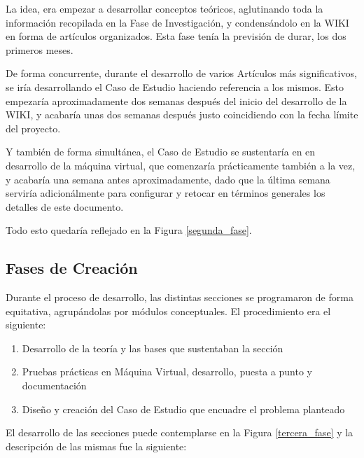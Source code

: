 La idea, era empezar a desarrollar conceptos teóricos, aglutinando toda la información recopilada en la Fase de Investigación, y condensándolo en la WIKI en forma de artículos organizados. Esta fase tenía la previsión de durar, los dos primeros meses.

De forma concurrente, durante el desarrollo de varios Artículos más significativos, se iría desarrollando el Caso de Estudio haciendo referencia a los mismos. Esto empezaría aproximadamente dos semanas después del inicio del desarrollo de la WIKI, y acabaría unas dos semanas después justo coincidiendo con la fecha límite del proyecto.

Y también de forma simultánea, el Caso de Estudio se sustentaría en en desarrollo de la máquina virtual, que comenzaría prácticamente también a la vez, y acabaría una semana antes aproximadamente, dado que la última semana serviría adicionálmente para configurar y retocar en términos generales los detalles de este documento.

Todo esto quedaría reflejado en la Figura \ref{segunda_fase}.


\subsection{Fases de Creación}

Durante el proceso de desarrollo, las distintas secciones se programaron de forma equitativa, agrupándolas por módulos conceptuales. El procedimiento era el siguiente:

\begin{enumerate}
	
	\setlength{\itemsep}{10pt}

	\item Desarrollo de la teoría y las bases que sustentaban la sección
	\item Pruebas prácticas en Máquina Virtual, desarrollo, puesta a punto y documentación
	\item Diseño y creación del Caso de Estudio que encuadre el problema planteado
\end{enumerate}

El desarrollo de las secciones puede contemplarse en la Figura \ref{tercera_fase} y la descripción de las mismas fue la siguiente:


